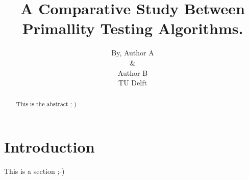 \documentclass[compressed,final,notitlepage,narroweqnarray,inline,twoside,]{ieee}
\title[TITLE]{A Comparative Study Between Primallity Testing Algorithms.}
\author{By, Author A\\ \& \\ Author B \\ TU Delft}
\begin{document}
\maketitle

\begin{abstract}
This is the abstract ;-)
\end{abstract}

\section{Introduction}
This is a section ;-)


 
\end{document}
